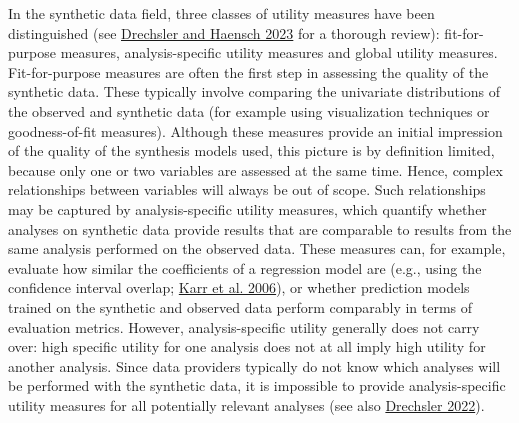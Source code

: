 \documentclass[
]{article}
\begin{document}
In the synthetic data field, three classes of utility measures have been
distinguished (see \protect\hyperlink{ref-drechsler2023}{Drechsler and
Haensch 2023} for a thorough review): fit-for-purpose measures,
analysis-specific utility measures and global utility measures.
Fit-for-purpose measures are often the first step in assessing the
quality of the synthetic data. These typically involve comparing the
univariate distributions of the observed and synthetic data (for example
using visualization techniques or goodness-of-fit measures). Although
these measures provide an initial impression of the quality of the
synthesis models used, this picture is by definition limited, because
only one or two variables are assessed at the same time. Hence, complex
relationships between variables will always be out of scope. Such
relationships may be captured by analysis-specific utility measures,
which quantify whether analyses on synthetic data provide results that
are comparable to results from the same analysis performed on the
observed data. These measures can, for example, evaluate how similar the
coefficients of a regression model are (e.g., using the confidence
interval overlap; \protect\hyperlink{ref-karr_utility_2006}{Karr et al.
2006}), or whether prediction models trained on the synthetic and
observed data perform comparably in terms of evaluation metrics.
However, analysis-specific utility generally does not carry over: high
specific utility for one analysis does not at all imply high utility for
another analysis. Since data providers typically do not know which
analyses will be performed with the synthetic data, it is impossible to
provide analysis-specific utility measures for all potentially relevant
analyses (see also
\protect\hyperlink{ref-drechsler_utility_2022}{Drechsler 2022}).
\end{document}
